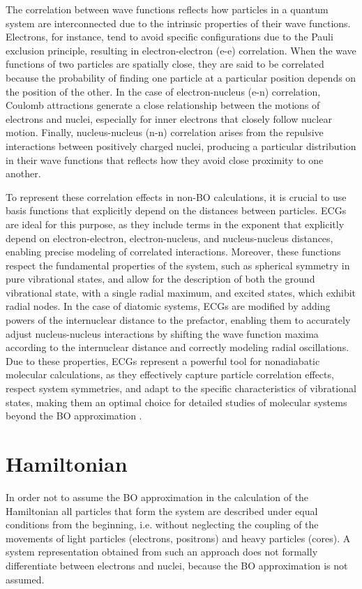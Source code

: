 \documentclass[%
 reprint,
 amsmath,amssymb,
 aps,
]{revtex4-2}
\begin{document}
The correlation between wave functions reflects how particles in a quantum system are interconnected due to the intrinsic properties of their wave functions. Electrons, for instance, tend to avoid specific configurations due to the Pauli exclusion principle, resulting in electron-electron (e-e) correlation. When the wave functions of two particles are spatially close, they are said to be correlated because the probability of finding one particle at a particular position depends on the position of the other. In the case of electron-nucleus (e-n) correlation, Coulomb attractions generate a close relationship between the motions of electrons and nuclei, especially for inner electrons that closely follow nuclear motion. Finally, nucleus-nucleus (n-n) correlation arises from the repulsive interactions between positively charged nuclei, producing a particular distribution in their wave functions that reflects how they avoid close proximity to one another.

To represent these correlation effects in non-BO calculations, it is crucial to use basis functions that explicitly depend on the distances between particles. ECGs are ideal for this purpose, as they include terms in the exponent that explicitly depend on electron-electron, electron-nucleus, and nucleus-nucleus distances, enabling precise modeling of correlated interactions. Moreover, these functions respect the fundamental properties of the system, such as spherical symmetry in pure vibrational states, and allow for the description of both the ground vibrational state, with a single radial maximum, and excited states, which exhibit radial nodes. In the case of diatomic systems, ECGs are modified by adding powers of the internuclear distance to the prefactor, enabling them to accurately adjust nucleus-nucleus interactions by shifting the wave function maxima according to the internuclear distance and correctly modeling radial oscillations. Due to these properties, ECGs represent a powerful tool for nonadiabatic molecular calculations, as they effectively capture particle correlation effects, respect system symmetries, and adapt to the specific characteristics of vibrational states, making them an optimal choice for detailed studies of molecular systems beyond the BO approximation \cite{Cencek1998, Bubin2011}.


\section{Hamiltonian}
In order not to assume the BO approximation in the calculation of the Hamiltonian all particles that form the system are described under equal conditions from the beginning, i.e. without neglecting the coupling of the movements of light particles (electrons, positrons) and heavy particles (cores). A system representation obtained from such an approach does not formally differentiate between electrons and nuclei, because the BO approximation is not assumed. 
\end{document}
